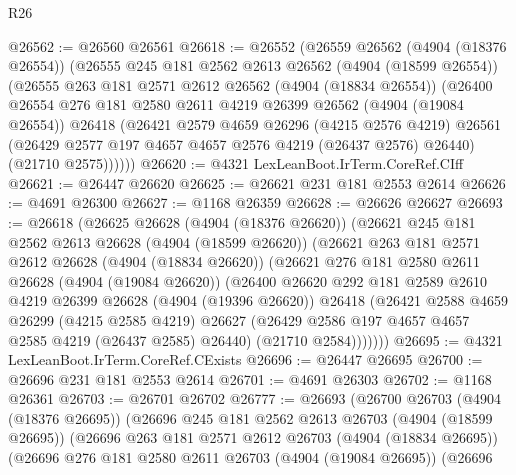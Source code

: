\begin{lexlean}{R26}
\begin{coremodule}
@26562 := @26560 @26561
@26618 := @26552
    (@26559
      @26562
      (@4904 (@18376 @26554))
      (@26555
        @245
        @181
        @2562
        @2613
        @26562
        (@4904 (@18599 @26554))
        (@26555
          @263
          @181
          @2571
          @2612
          @26562
          (@4904 (@18834 @26554))
          (@26400
            @26554
            @276
            @181
            @2580
            @2611
            @4219
            @26399
            @26562
            (@4904 (@19084 @26554))
            @26418
            (@26421
              @2579
              @4659
              @26296
              (@4215 @2576 @4219)
              @26561
              (@26429 @2577 @197 @4657 @4657 @2576 @4219 (@26437 @2576) @26440)
              (@21710 @2575))))))
@26620 := @4321 LexLeanBoot.IrTerm.CoreRef.CIff
@26621 := @26447 @26620
@26625 := @26621 @231 @181 @2553 @2614
@26626 := @4691 @26300
@26627 := @1168 @26359
@26628 := @26626 @26627
@26693 := @26618
    (@26625
      @26628
      (@4904 (@18376 @26620))
      (@26621
        @245
        @181
        @2562
        @2613
        @26628
        (@4904 (@18599 @26620))
        (@26621
          @263
          @181
          @2571
          @2612
          @26628
          (@4904 (@18834 @26620))
          (@26621
            @276
            @181
            @2580
            @2611
            @26628
            (@4904 (@19084 @26620))
            (@26400
              @26620
              @292
              @181
              @2589
              @2610
              @4219
              @26399
              @26628
              (@4904 (@19396 @26620))
              @26418
              (@26421
                @2588
                @4659
                @26299
                (@4215 @2585 @4219)
                @26627
                (@26429 @2586 @197 @4657 @4657 @2585 @4219 (@26437 @2585) @26440)
                (@21710 @2584)))))))
@26695 := @4321 LexLeanBoot.IrTerm.CoreRef.CExists
@26696 := @26447 @26695
@26700 := @26696 @231 @181 @2553 @2614
@26701 := @4691 @26303
@26702 := @1168 @26361
@26703 := @26701 @26702
@26777 := @26693
    (@26700
      @26703
      (@4904 (@18376 @26695))
      (@26696
        @245
        @181
        @2562
        @2613
        @26703
        (@4904 (@18599 @26695))
        (@26696
          @263
          @181
          @2571
          @2612
          @26703
          (@4904 (@18834 @26695))
          (@26696
            @276
            @181
            @2580
            @2611
            @26703
            (@4904 (@19084 @26695))
            (@26696

\end{coremodule}
\end{lexlean}
